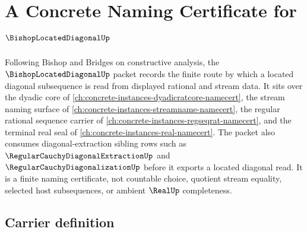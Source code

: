 \chapter{A Concrete Naming Certificate for $\BishopLocatedDiagonalUp$}
\label{ch:concrete-instances-bishop-located-diagonal-namecert}

Following Bishop and Bridges on constructive analysis, the $\BishopLocatedDiagonalUp$ packet records the finite route by which a located diagonal subsequence is read from displayed rational and stream data. It sits over the dyadic core of \autoref{ch:concrete-instances-dyadicratcore-namecert}, the stream naming surface of \autoref{ch:concrete-instances-streamname-namecert}, the regular rational sequence carrier of \autoref{ch:concrete-instances-regseqrat-namecert}, and the terminal real seal of \autoref{ch:concrete-instances-real-namecert}. The packet also consumes diagonal-extraction sibling rows such as $\RegularCauchyDiagonalExtractionUp$ and $\RegularCauchyDiagonalizationUp$ before it exports a located diagonal read. It is a finite naming certificate, not countable choice, quotient stream equality, selected host subsequences, or ambient $\RealUp$ completeness.

\section{Carrier definition}
\label{sec:bishop-located-diagonal-carrier}

